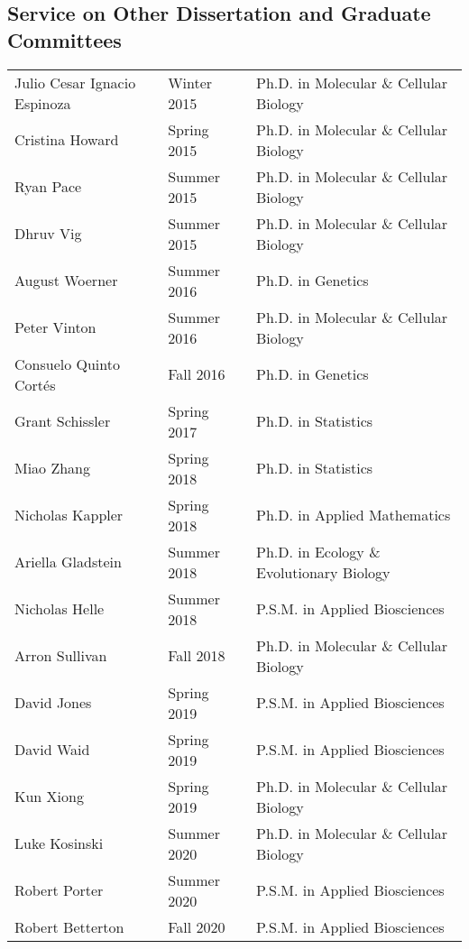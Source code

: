 \documentclass[11pt]{article}
\begin{document}
\subsection*{Service on Other Dissertation and Graduate Committees}
\begin{longtable}[l]{l l l}
Julio Cesar Ignacio Espinoza & Winter 2015 & Ph.D. in Molecular \& Cellular Biology\\
Cristina Howard & Spring 2015 & Ph.D. in Molecular \& Cellular Biology\\
Ryan Pace & Summer 2015 & Ph.D. in Molecular \& Cellular Biology\\
Dhruv Vig & Summer 2015 & Ph.D. in Molecular \& Cellular Biology\\
August Woerner & Summer 2016 & Ph.D. in Genetics\\
Peter Vinton & Summer 2016 & Ph.D. in Molecular \& Cellular Biology\\
Consuelo Quinto Cort\'{e}s & Fall 2016 & Ph.D. in Genetics\\
Grant Schissler & Spring 2017 & Ph.D. in Statistics\\
Miao Zhang & Spring 2018 & Ph.D. in Statistics\\
Nicholas Kappler & Spring 2018 & Ph.D. in Applied Mathematics\\
Ariella Gladstein & Summer 2018 & Ph.D. in Ecology \& Evolutionary Biology\\
Nicholas Helle & Summer 2018 & P.S.M. in Applied Biosciences\\
Arron Sullivan & Fall 2018 & Ph.D. in Molecular \& Cellular Biology\\
David Jones & Spring 2019 & P.S.M. in Applied Biosciences\\
David Waid & Spring 2019 & P.S.M. in Applied Biosciences\\
Kun Xiong & Spring 2019 & Ph.D. in Molecular \& Cellular Biology\\
Luke Kosinski & Summer 2020 & Ph.D. in Molecular \& Cellular Biology\\
Robert Porter & Summer 2020 & P.S.M. in Applied Biosciences\\
Robert Betterton & Fall 2020 & P.S.M. in Applied Biosciences\\

\end{longtable}
\end{document}
